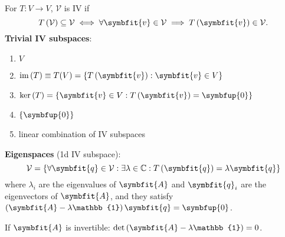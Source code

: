 \documentclass{article}
\begin{document}
\begin{minipage}[t]{126.1962963mm}
\begin{multicols*}{2}
        For \(T:V\rightarrow V\), \(\mathcal{V}\) is IV if
        \begin{equation*}
            T\left(\mathcal{V}\right)\subseteq \mathcal{V}\iff\forall \symbfit{v}
            \in \mathcal{V}\implies T\left(\symbfit{v}\right)\in \mathcal{V}.
        \end{equation*}
        \textbf{Trivial IV subspaces}:
        \begin{enumerate}
            \item \(V\)
            \item \(\vim{\left( T \right)} \equiv T(V) = \left\{ T\left(\symbfit{v}\right) : \symbfit{v}\in V \right\}\)
            \item \(\vker{\left( T \right)} = \left\{ \symbfit{v}\in V : T\left(\symbfit{v}\right) = \symbfup{0} \right\}\)
            \item \(\left\{ \symbfup{0} \right\}\)
            \item linear combination of IV subspaces
        \end{enumerate}
        \textbf{Eigenspaces} (1d IV subspace):
        \begin{equation*}
            \mathcal{V} = \left\{ \forall \symbfit{q}\in \mathcal{V}:\exists
            \lambda \in \mathbb{C}:T\left(\symbfit{q}\right) = \lambda \symbfit{q} \right\}
        \end{equation*}
        where \(\lambda_i\) are the eigenvalues of \(\symbfit{A}\) and
        \(\symbfit{q}_i\) are the eigenvectors of \(\symbfit{A}\), and they satisfy
        \(\left( \symbfit{A} - \lambda \mathbb{1} \right) \symbfit{q}=\symbfup{0}\).

        If \(\symbfit{A}\) is invertible:
        \(\det{\left( \symbfit{A} - \lambda\mathbb{1} \right)} = 0\).


\end{multicols*}
\end{minipage}
\end{document}
